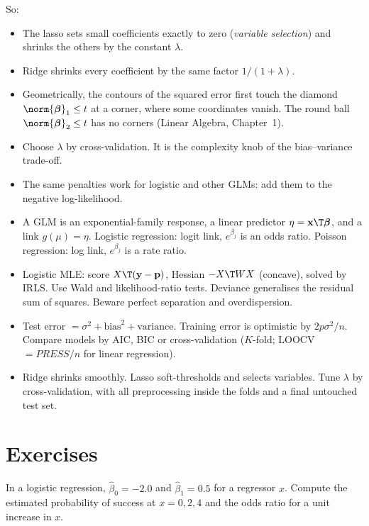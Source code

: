 So:
\begin{itemize}
  \item The lasso sets small coefficients exactly to zero (\emph{variable selection}) and shrinks the others by the constant $\lambda$.
  \item Ridge shrinks every coefficient by the same factor $1/(1+\lambda)$.
  \item Geometrically, the contours of the squared error first touch the diamond $\norm{\boldsymbol\beta}_1\le t$ at a corner, where some coordinates vanish. The round ball $\norm{\boldsymbol\beta}_2\le t$ has no corners (Linear Algebra, Chapter~1).
  \item Choose $\lambda$ by cross-validation. It is the complexity knob of the bias--variance trade-off.
  \item The same penalties work for logistic and other GLMs: add them to the negative log-likelihood.
\end{itemize}

\begin{summarybox}
\begin{itemize}
  \item A GLM is an exponential-family response, a linear predictor $\eta=\mathbf{x}\T\boldsymbol\beta$, and a link $g(\mu)=\eta$. Logistic regression: logit link, $e^{\beta_j}$ is an odds ratio. Poisson regression: log link, $e^{\beta_j}$ is a rate ratio.
  \item Logistic MLE: score $X\T(\mathbf{y}-\mathbf{p})$, Hessian $-X\T WX$ (concave), solved by IRLS. Use Wald and likelihood-ratio tests. Deviance generalises the residual sum of squares. Beware perfect separation and overdispersion.
  \item Test error $=\sigma^2+\text{bias}^2+\text{variance}$. Training error is optimistic by $2p\sigma^2/n$. Compare models by AIC, BIC or cross-validation ($K$-fold; LOOCV $=PRESS/n$ for linear regression).
  \item Ridge shrinks smoothly. Lasso soft-thresholds and selects variables. Tune $\lambda$ by cross-validation, with all preprocessing inside the folds and a final untouched test set.
\end{itemize}
\end{summarybox}

\section{Exercises}

\begin{exercise}
In a logistic regression, $\hat\beta_0=-2.0$ and $\hat\beta_1=0.5$ for a regressor $x$. Compute the estimated probability of success at $x=0,2,4$ and the odds ratio for a unit increase in $x$.
\end{exercise}

